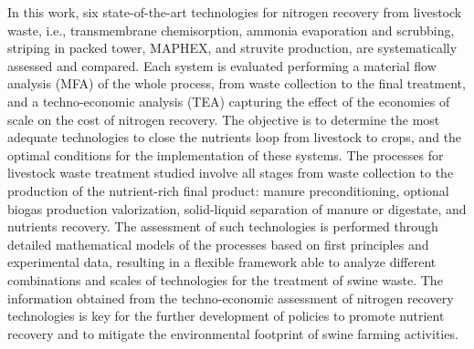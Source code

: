 \begin{refsection}[referencesCh6]
In this work, six state-of-the-art technologies for nitrogen recovery from livestock waste, i.e., transmembrane  chemisorption, ammonia evaporation and scrubbing, striping in packed tower, MAPHEX, and struvite production, are systematically assessed and compared. Each system is evaluated performing a material flow analysis (MFA) of the whole process, from waste collection to the final treatment, and a techno-economic analysis (TEA) capturing the effect of the economies of scale on the cost of nitrogen recovery.
The objective is to determine the most adequate technologies to close the nutrients loop from livestock to crops, and the optimal conditions for the implementation of
these systems. The processes for livestock waste treatment studied involve all stages from waste collection to the production of the nutrient-rich final product: manure preconditioning, optional biogas production valorization, solid-liquid separation of manure or digestate, and nutrients recovery. The assessment of such technologies is performed through detailed mathematical models of the processes based on first principles and experimental data, resulting in a flexible framework able to analyze different combinations and scales of technologies for the treatment of swine waste. The information obtained from the techno-economic assessment of nitrogen recovery technologies is key for the further development of policies to promote nutrient recovery and to mitigate the environmental footprint of swine farming activities.


\end{refsection}
